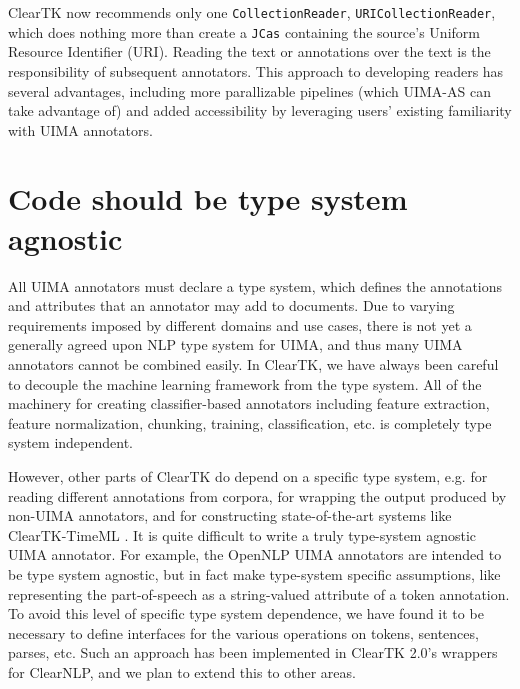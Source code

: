 \documentclass[10pt, a4paper]{article}
\newcommand{\code}[1]{\texttt{\small #1}}
\begin{document}
ClearTK now recommends only one \code{CollectionReader}, \code{URICollectionReader}, which does nothing more than create a \code{JCas} containing the source's Uniform Resource Identifier (URI).
Reading the text or annotations over the text is the responsibility of subsequent annotators.
This approach to developing readers has several advantages, including more parallizable pipelines (which UIMA-AS can take advantage of) and added accessibility by leveraging users' existing familiarity with UIMA annotators.


\section{Code should be type system agnostic}
All UIMA annotators must declare a type system, which defines the annotations and attributes that an annotator may add to documents.
Due to varying requirements imposed by different domains and use cases, there is not yet a generally agreed upon NLP type system for UIMA, and thus many UIMA annotators cannot be combined easily.
In ClearTK, we have always been careful to decouple the machine learning framework from the type system. All of the machinery for creating classifier-based annotators including feature extraction, feature normalization, chunking, training, classification, etc. is completely type system independent.


However, other parts of ClearTK do depend on a specific type system, e.g. for reading different annotations from corpora, for wrapping the output produced by non-UIMA annotators, and for constructing state-of-the-art systems like ClearTK-TimeML \cite{bethard:2013:SemEval-2013}.
It is quite difficult to write a truly type-system agnostic UIMA annotator.
For example, the OpenNLP UIMA annotators are intended to be type system agnostic, but in fact make type-system specific assumptions, like representing the part-of-speech as a string-valued attribute of a token annotation.
To avoid this level of specific type system dependence, we have found it to be necessary to define interfaces for the various operations on tokens, sentences, parses, etc.
Such an approach has been implemented in ClearTK 2.0's wrappers for ClearNLP, and we plan to extend this to other areas.
\end{document}

